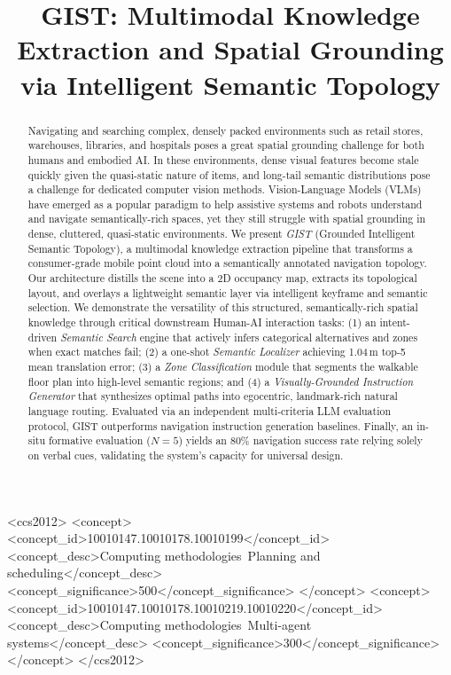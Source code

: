 \documentclass[sigconf,anonymous,review]{acmart}
\begin{document}
\title{GIST: Multimodal Knowledge Extraction and Spatial Grounding via Intelligent Semantic Topology}

\begin{abstract}
Navigating and searching complex, densely packed environments such as retail stores, warehouses, libraries, and hospitals poses a great spatial grounding challenge for both humans and embodied AI. In these environments, dense visual features become stale quickly given the quasi-static nature of items, and long-tail semantic distributions pose a challenge for dedicated computer vision methods. Vision-Language Models (VLMs) have emerged as a popular paradigm to help assistive systems and robots understand and navigate semantically-rich spaces, yet they still struggle with spatial grounding in dense, cluttered, quasi-static environments. We present \emph{GIST} (Grounded Intelligent Semantic Topology), a multimodal knowledge extraction pipeline that transforms a consumer-grade mobile point cloud into a semantically annotated navigation topology. Our architecture distills the scene into a 2D occupancy map, extracts its topological layout, and overlays a lightweight semantic layer via intelligent keyframe and semantic selection. We demonstrate the versatility of this structured, semantically-rich spatial knowledge through critical downstream Human-AI interaction tasks: (1) an intent-driven \emph{Semantic Search} engine that actively infers categorical alternatives and zones when exact matches fail; (2) a one-shot \emph{Semantic Localizer} achieving 1.04\,m top-5 mean translation error; (3) a \emph{Zone Classification} module that segments the walkable floor plan into high-level semantic regions; and (4) a \emph{Visually-Grounded Instruction Generator} that synthesizes optimal paths into egocentric, landmark-rich natural language routing. Evaluated via an independent multi-criteria LLM evaluation protocol, GIST outperforms navigation instruction generation baselines. Finally, an in-situ formative evaluation ($N=5$) yields an 80\% navigation success rate relying solely on verbal cues, validating the system's capacity for universal design.
\end{abstract}

\begin{CCSXML}
<ccs2012>
 <concept>
  <concept_id>10010147.10010178.10010199</concept_id>
  <concept_desc>Computing methodologies~Planning and scheduling</concept_desc>
  <concept_significance>500</concept_significance>
 </concept>
 <concept>
  <concept_id>10010147.10010178.10010219.10010220</concept_id>
  <concept_desc>Computing methodologies~Multi-agent systems</concept_desc>
  <concept_significance>300</concept_significance>
 </concept>
</ccs2012>
\end{CCSXML}
\end{document}
